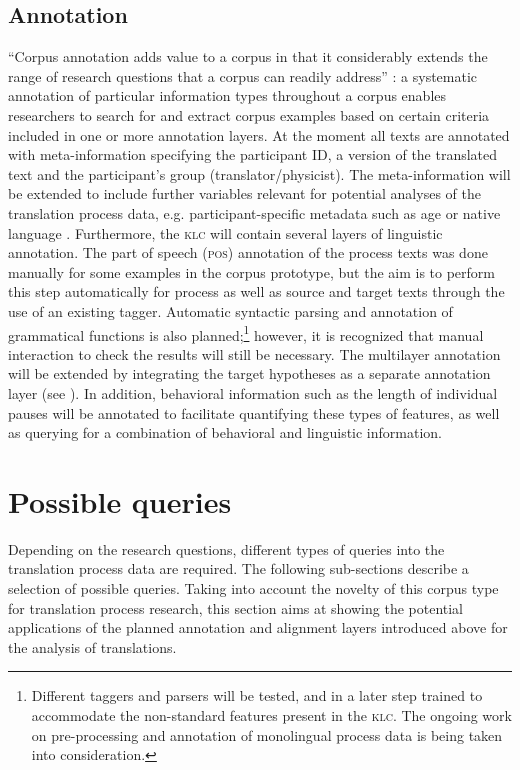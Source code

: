 \documentclass[output=paper]{LSP/langsci}
\begin{document}
\subsection{Annotation} \label{sec:1:2:3}
“Corpus annotation adds value to a corpus in that it considerably extends the range of research questions that a corpus can readily address” \citep[29]{McEnery2006}: a systematic annotation of particular information types throughout a corpus enables researchers to search for and extract corpus examples based on certain criteria included in one or more annotation layers. At the moment all texts are annotated with meta-information specifying the participant ID, a version of the translated text and the participant's group (translator/physicist). The meta-information will be extended to include further variables relevant for potential analyses of the translation process data, e.g. participant-specific metadata such as age or native language \citep[see][]{Hvelplund2012}. Furthermore, the \textsc{klc} will contain several layers of linguistic annotation. The part of speech (\textsc{pos}) annotation of the process texts was done manually for some examples in the corpus prototype, but the aim is to perform this step automatically for process as well as source and target texts through the use of an existing tagger. Automatic syntactic parsing and annotation of grammatical functions is also planned;\footnote{Different taggers and parsers will be tested, and in a later step trained to accommodate the non-standard features present in the \textsc{klc}. The ongoing work on pre-processing and annotation of monolingual process data \citep{Leijten2012,Macken2012} is being taken into consideration.} however, it is recognized that manual interaction to check the results will still be necessary. The multilayer annotation \citep[see][]{Hansen-Schirra2006} will be extended by integrating the target hypotheses as a separate annotation layer (see ). In addition, behavioral information such as the length of individual pauses \citep[see][]{Alves2009,Alves2011} will be annotated to facilitate quantifying these types of features, as well as querying for a combination of behavioral and linguistic information.

\section{Possible queries} \label{sec:1:3}
Depending on the research questions, different types of queries into the translation process data are required. The following sub-sections describe a selection of possible queries. Taking into account the novelty of this corpus type for translation process research, this section aims at showing the potential applications of the planned annotation and alignment layers introduced above for the analysis of translations.
\end{document}
